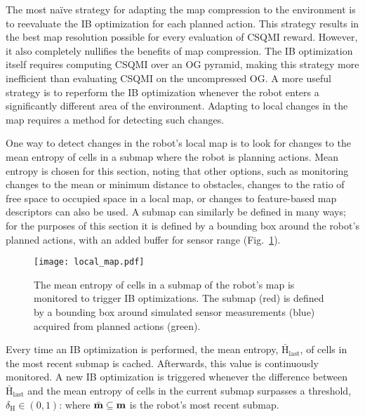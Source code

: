 The most na\"{i}ve strategy for adapting the map compression to the environment
is to reevaluate the IB optimization for each planned action. This
strategy results in the best map resolution possible for every evaluation of CSQMI
reward. However, it also completely nullifies the benefits of map compression.
The IB optimization itself requires computing CSQMI over an OG
pyramid, making this strategy more inefficient than evaluating CSQMI on the uncompressed
OG. A more useful strategy is to reperform the IB optimization whenever the robot enters a significantly
different area of the environment. Adapting to local changes in
the map requires a method for detecting such changes.

One way to detect changes in the robot's local map is to look for changes to the mean
entropy of cells in a submap where the robot is planning actions. Mean entropy is
chosen for this section, noting that other options,
such as monitoring changes to the mean or minimum distance to obstacles,
changes to the ratio of free space to occupied space in a local map, or changes
to feature-based
map descriptors can also be used. A submap can similarly be defined in many ways; for
the purposes of this section it is defined by a bounding box around the robot's
planned actions, with an added buffer for sensor range (Fig.~\ref{fig:local_map}).

\begin{figure}
  \centering
  \texttt{[image: local\_map.pdf]}
  \caption[A submap used for IB optimization.]{The mean entropy of cells in a
    submap of the robot's map is monitored to trigger IB optimizations. The submap (red) is defined by a bounding box
    around simulated sensor measurements (blue) acquired from planned actions
  (green). \label{fig:local_map}}
\end{figure}

Every time an IB optimization is performed, the mean entropy,
$\bar{\text{H}}_{\text{last}}$, of cells in the
most recent submap is cached. Afterwards, this value is continuously
monitored. A new IB optimization is triggered whenever the difference between
$\bar{\text{H}}_{\text{last}}$ and the mean entropy of cells in the current
submap surpasses a threshold, $\delta_{\text{H}} \in (0, 1)$:
%
%
where $\bar{\mathbf{m}} \subseteq \mathbf{m}$ is the robot's most recent submap.

